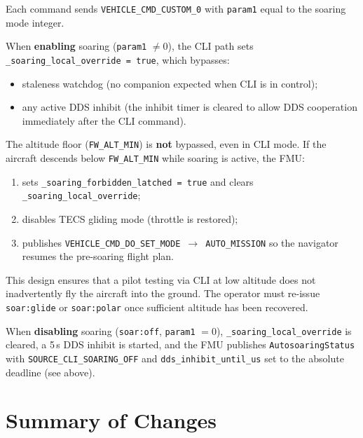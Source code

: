 \documentclass[12pt,a4paper]{article}
\begin{document}
Each command sends \texttt{VEHICLE\_CMD\_CUSTOM\_0} with \texttt{param1}
equal to the soaring mode integer.

When \textbf{enabling} soaring (\texttt{param1} $\neq 0$), the CLI path sets
\texttt{\_soaring\_local\_override = true}, which bypasses:
\begin{itemize}
  \item staleness watchdog (no companion expected when CLI is in control);
  \item any active DDS inhibit (the inhibit timer is cleared to allow DDS
        cooperation immediately after the CLI command).
\end{itemize}

\noindent
The altitude floor (\texttt{FW\_ALT\_MIN}) is \textbf{not} bypassed, even in
CLI mode. If the aircraft descends below \texttt{FW\_ALT\_MIN} while soaring
is active, the FMU:
\begin{enumerate}
  \item sets \texttt{\_soaring\_forbidden\_latched = true} and clears
        \texttt{\_soaring\_local\_override};
  \item disables TECS gliding mode (throttle is restored);
  \item publishes \texttt{VEHICLE\_CMD\_DO\_SET\_MODE $\to$ AUTO\_MISSION} so
        the navigator resumes the pre-soaring flight plan.
\end{enumerate}
\noindent
This design ensures that a pilot testing via CLI at low altitude does not
inadvertently fly the aircraft into the ground. The operator must re-issue
\texttt{soar:glide} or \texttt{soar:polar} once sufficient altitude has been
recovered.

When \textbf{disabling} soaring (\texttt{soar:off}, \texttt{param1} $= 0$),
\texttt{\_soaring\_local\_override} is cleared, a 5\,s DDS inhibit is started,
and the FMU publishes \texttt{AutosoaringStatus} with
\texttt{SOURCE\_CLI\_SOARING\_OFF} and \texttt{dds\_inhibit\_until\_us} set to
the absolute deadline (see above).

\section{Summary of Changes}
\end{document}
